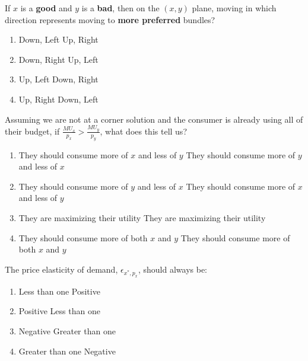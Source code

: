 \begin{question}[type=exam]{4}
  If $x$ is a \textbf{good} and $y$ is a \textbf{bad}, then on the $(x,y)$ plane, moving in which direction represents moving to \textbf{more preferred} bundles?
  \begin{enumerate}[label=\alph*), noitemsep]
    \item \vary
      {Down, Left}
      {Up, Right}
    \item \vary
      {Down, Right} %
      {Up, Left}
    \item \vary
      {Up, Left}
      {Down, Right} %
    \item \vary
      {Up, Right}
      {Down, Left}
  \end{enumerate}
\end{question}


\begin{question}[type=exam]{4}
  Assuming we are not at a corner solution and the consumer is already using all of their budget,
  if $\frac{MU_x}{p_x} > \frac{MU_y}{p_y}$, what does this tell us?
  \begin{enumerate}[label=\alph*), noitemsep]
    \item \vary
      {They should consume more of $x$ and less of $y$} %
      {They should consume more of $y$ and less of $x$}
    \item \vary
      {They should consume more of $y$ and less of $x$}
      {They should consume more of $x$ and less of $y$} %
    \item \vary
      {They are maximizing their utility}
      {They are maximizing their utility}
    \item \vary
      {They should consume more of both $x$ and $y$}
      {They should consume more of both $x$ and $y$}
  \end{enumerate}
\end{question}

\begin{question}[type=exam]{4}
  The price elasticity of demand, $\epsilon_{x^*,p_x}$, should always be:
  \begin{enumerate}[label=\alph*), noitemsep]
    \item \vary
      {Less than one}
      {Positive}
    \item \vary
      {Positive}
      {Less than one}
    \item \vary
      {Negative} %
      {Greater than one}
    \item \vary
      {Greater than one}
      {Negative} %
  \end{enumerate}
\end{question}

